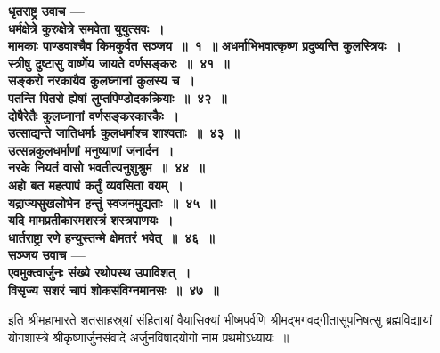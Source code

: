 \begin{center}{\bfseries धृतराष्ट्र उवाच —\\ धर्मक्षेत्रे कुरुक्षेत्रे समवेता युयुत्सवः~।\\मामकाः पाण्डवाश्चैव किमकुर्वत सञ्जय~॥~१~॥}
{\bfseries अधर्माभिभवात्कृष्ण प्रदुष्यन्ति कुलस्त्रियः~।\\स्त्रीषु दुष्टासु वार्ष्णेय जायते वर्णसङ्करः~॥~४१~॥}\\[10pt]
{\bfseries सङ्करो नरकायैव कुलघ्नानां कुलस्य च~।\\पतन्ति पितरो ह्येषां लुप्तपिण्डोदकक्रियाः~॥~४२~॥}\\[10pt]
{\bfseries दोषैरेतैः कुलघ्नानां वर्णसङ्करकारकैः~।\\उत्साद्यन्ते जातिधर्माः कुलधर्माश्च शाश्वताः~॥~४३~॥}\\[10pt]
{\bfseries उत्सन्नकुलधर्माणां मनुष्याणां जनार्दन~।\\नरके नियतं वासो भवतीत्यनुशुश्रुम~॥~४४~॥}\\[10pt]
{\bfseries अहो बत महत्पापं कर्तुं व्यवसिता वयम्~।\\यद्राज्यसुखलोभेन हन्तुं स्वजनमुद्यताः~॥~४५~॥}\\[10pt]
{\bfseries यदि मामप्रतीकारमशस्त्रं शस्त्रपाणयः~।\\धार्तराष्ट्रा रणे हन्युस्तन्मे क्षेमतरं भवेत्~॥~४६~॥}\\[10pt]
{\bfseries सञ्जय उवाच —}\\ 
{\bfseries एवमुक्त्वार्जुनः सं‍ख्ये रथोपस्थ उपाविशत्~।\\विसृज्य सशरं चापं शोकसंविग्नमानसः~॥~४७~॥}\end{center}
 
इति श्रीमहाभारते शतसाहस्र्यां संहितायां वैयासिक्यां भीष्मपर्वणि श्रीमद्भगवद्गीतासूपनिषत्सु ब्रह्मविद्यायां योगशास्त्रे श्रीकृष्णार्जुनसंवादे अर्जुनविषादयोगो नाम प्रथमोऽध्यायः~॥\par
 
